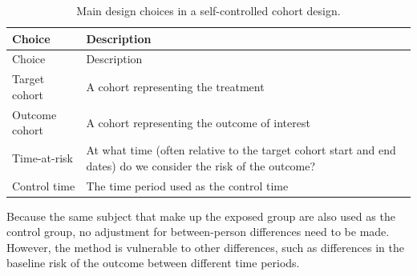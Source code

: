 \documentclass[11pt]{book}
\theoremstyle{definition}
\theoremstyle{definition}
\theoremstyle{definition}
\theoremstyle{remark}
\begin{document}
\begin{longtable}[]{@{}ll@{}}
\caption{\label{tab:sccChoices} Main design choices in a self-controlled cohort design.}\tabularnewline
\toprule
\begin{minipage}[b]{0.23\columnwidth}\raggedright
Choice\strut
\end{minipage} & \begin{minipage}[b]{0.72\columnwidth}\raggedright
Description\strut
\end{minipage}\tabularnewline
\midrule
\endfirsthead
\toprule
\begin{minipage}[b]{0.23\columnwidth}\raggedright
Choice\strut
\end{minipage} & \begin{minipage}[b]{0.72\columnwidth}\raggedright
Description\strut
\end{minipage}\tabularnewline
\midrule
\endhead
\begin{minipage}[t]{0.23\columnwidth}\raggedright
Target cohort\strut
\end{minipage} & \begin{minipage}[t]{0.72\columnwidth}\raggedright
A cohort representing the treatment\strut
\end{minipage}\tabularnewline
\begin{minipage}[t]{0.23\columnwidth}\raggedright
Outcome cohort\strut
\end{minipage} & \begin{minipage}[t]{0.72\columnwidth}\raggedright
A cohort representing the outcome of interest\strut
\end{minipage}\tabularnewline
\begin{minipage}[t]{0.23\columnwidth}\raggedright
Time-at-risk\strut
\end{minipage} & \begin{minipage}[t]{0.72\columnwidth}\raggedright
At what time (often relative to the target cohort start and end dates) do we consider the risk of the outcome?\strut
\end{minipage}\tabularnewline
\begin{minipage}[t]{0.23\columnwidth}\raggedright
Control time\strut
\end{minipage} & \begin{minipage}[t]{0.72\columnwidth}\raggedright
The time period used as the control time\strut
\end{minipage}\tabularnewline
\bottomrule
\end{longtable}

Because the same subject that make up the exposed group are also used as the control group, no adjustment for between-person differences need to be made. However, the method is vulnerable to other differences, such as differences in the baseline risk of the outcome between different time periods.
\end{document}
